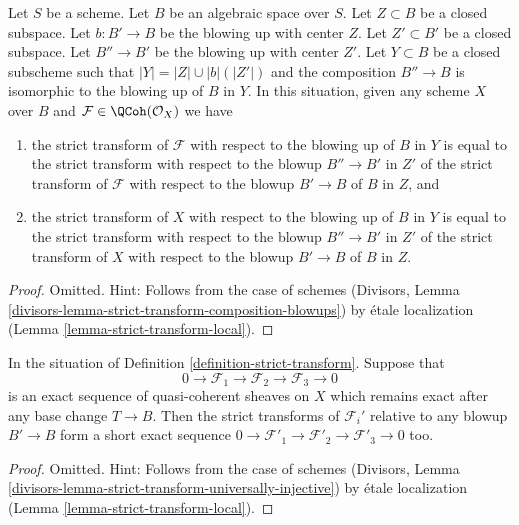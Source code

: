 \begin{lemma}
\label{lemma-strict-transform-composition-blowups}
Let $S$ be a scheme. Let $B$ be an algebraic space over $S$.
Let $Z \subset B$ be a closed subspace.
Let $b : B' \to B$ be the blowing up with center $Z$.
Let $Z' \subset B'$ be a closed subspace.
Let $B'' \to B'$ be the blowing up with center $Z'$.
Let $Y \subset B$ be a closed subscheme such that
$|Y| = |Z| \cup |b|(|Z'|)$ and the composition $B'' \to B$
is isomorphic to the blowing up of $B$ in $Y$.
In this situation, given any scheme $X$ over $B$ and
$\mathcal{F} \in \QCoh(\mathcal{O}_X)$ we have
\begin{enumerate}
\item the strict transform of $\mathcal{F}$ with respect to the blowing
up of $B$ in $Y$ is equal to the strict transform with respect to the
blowup $B'' \to B'$ in $Z'$ of the strict transform of $\mathcal{F}$
with respect to the blowup $B' \to B$ of $B$ in $Z$, and
\item the strict transform of $X$ with respect to the blowing
up of $B$ in $Y$ is equal to the strict transform with respect to the
blowup $B'' \to B'$ in $Z'$ of the strict transform of $X$
with respect to the blowup $B' \to B$ of $B$ in $Z$.
\end{enumerate}
\end{lemma}

\begin{proof}
Omitted. Hint: Follows from the case of schemes
(Divisors, Lemma \ref{divisors-lemma-strict-transform-composition-blowups})
by \'etale localization (Lemma \ref{lemma-strict-transform-local}).
\end{proof}

\begin{lemma}
\label{lemma-strict-transform-universally-injective}
In the situation of Definition \ref{definition-strict-transform}.
Suppose that
$$
0 \to \mathcal{F}_1 \to \mathcal{F}_2 \to \mathcal{F}_3 \to 0
$$
is an exact sequence of quasi-coherent sheaves on $X$ which remains
exact after any base change $T \to B$. Then the strict transforms of
$\mathcal{F}_i'$ relative to any blowup $B' \to B$
form a short exact sequence
$0 \to \mathcal{F}'_1 \to \mathcal{F}'_2 \to \mathcal{F}'_3 \to 0$ too.
\end{lemma}

\begin{proof}
Omitted. Hint: Follows from the case of schemes
(Divisors, Lemma \ref{divisors-lemma-strict-transform-universally-injective})
by \'etale localization (Lemma \ref{lemma-strict-transform-local}).
\end{proof}












